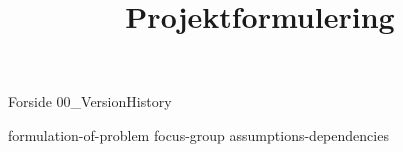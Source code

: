 \documentclass[a4paper,openany]{memoir}
\title{Projektformulering}
\begin{document}
	{Forside}  \newpage
	\tableofcontents\thispagestyle{fancy}
	{00_VersionHistory}  \newpage

	{formulation-of-problem}  \newpage
	{focus-group}  \newpage
	{assumptions-dependencies}  \newpage

	 {}
	\printbibliography
\end{document}
